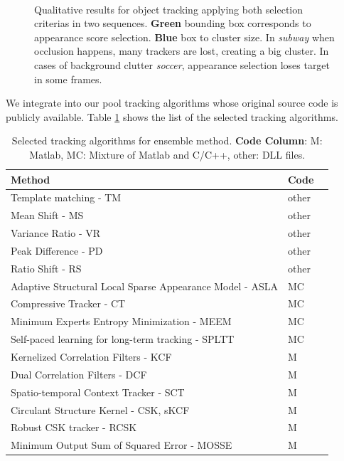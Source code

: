\begin{figure}[t!]
\centering
	 \\
\vspace{-2mm}
\caption{\small Qualitative results for object tracking applying both selection
	criterias in two sequences. \textbf{Green} bounding box corresponds to
	appearance score selection. \textbf{Blue} box to cluster size. In
	\textit{subway} when occlusion happens, many trackers are lost, creating a
	big cluster. In cases of background clutter \textit{soccer}, appearance
	selection loses target in some frames.}
\label{fig::clustvsapp}
\end{figure}

We integrate into our pool tracking algorithms whose original source code
is publicly available.
Table \ref{table:trackers} shows the list of the
selected tracking algorithms. 

\begin{table}[h!]
\centering
\caption{\small Selected tracking algorithms for ensemble method. \textbf{Code Column}: 
M: Matlab, MC: Mixture of Matlab and C/C++, other: DLL files.}
\begin{tabular}{@{}p{9.5cm}ll@{}}
\toprule
 \textbf{Method}&  \textbf{Code}&  \\ \midrule
 Template matching - TM \cite{Collins2005a}&  other&  \\
 Mean Shift - MS \cite{Collins2005a}&  other&  \\
 Variance Ratio - VR \cite{Collins2005a}&  other&  \\
 Peak Difference - PD \cite{Collins2005a}&  other&  \\
 Ratio Shift - RS \cite{Collins2005a}&  other&  \\ 
 Adaptive Structural Local Sparse Appearance Model - ASLA \cite{Jia2012}&  MC& 
 \\  Compressive Tracker - CT \cite{Zhang2012a}&  MC&  \\
 Minimum Experts Entropy Minimization - MEEM \cite{zhang2014meem}&  MC&  \\ 
 Self-paced learning for long-term tracking - SPLTT \cite{Supancic2013}&  MC& \\ 
 Kernelized Correlation Filters - KCF \cite{Henriques2014}&  M&  \\ 
 Dual Correlation Filters - DCF \cite{Henriques2014}&  M&  \\  
 Spatio-temporal Context Tracker - SCT \cite{Zhang2013}&  M&  \\
 Circulant Structure Kernel - CSK, sKCF \cite{Henriques2014}&  M&  \\
 Robust CSK tracker - RCSK \cite{Danelljan2014}&  M&  \\  
 Minimum Output Sum of Squared Error - MOSSE \cite{Bolme2010}&  M&  \\ 
\bottomrule
\end{tabular}
\label{table:trackers}
\end{table}


